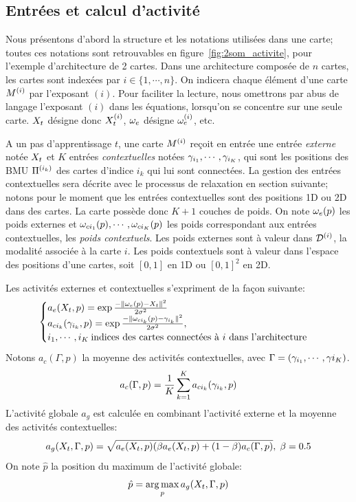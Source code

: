 \subsection{Entrées et calcul d'activité}
Nous présentons d'abord la structure et les notations utilisées dans une carte; toutes ces notations sont retrouvables en figure~\ref{fig:2som_activite}, pour l'exemple d'architecture de 2 cartes. Dans une architecture composée de $n$ cartes, les cartes sont indexées par $i \in \{1,\cdots,n\}$. On indicera chaque élément d'une carte $M^{({i})}$ par l'exposant $(i)$.
Pour faciliter la lecture, nous omettrons par abus de langage l'exposant $(i)$ dans les équations, lorsqu'on se concentre sur une seule carte. $X_t$ désigne donc $X_t^{({i})}$, $\omega_e$ désigne $\omega_e^{({i})}$, etc.


A un pas d'apprentissage $t$, une carte $M^{({i})}$ reçoit en entrée une entrée \emph{externe} notée $X_t$ et $K$ entrées \emph{contextuelles} notées $\gamma_{i_1},\cdots,\gamma_{i_K}$, qui sont les positions des BMU $\Pi^{({i_k})}$ des cartes d'indice $i_k$ qui lui sont connectées. La gestion des entrées contextuelles sera décrite avec le processus de relaxation en section suivante; notons pour le moment que les entrées contextuelles sont des positions 1D ou 2D dans des cartes. 
La carte possède donc $K+1$ couches de poids. On  note $\omega_e(p)$ les poids externes et $\omega_{ci_1}(p), \cdots, \omega_{ci_K}(p)$ les poids correspondant aux entrées contextuelles, les \emph{poids contextuels}. Les poids externes sont à valeur dans $\mathcal{D}^{({i})}$, la modalité associée à la carte $i$. Les poids contextuels sont à valeur dans l'espace des positions d'une cartes, soit $[0,1]$ en 1D ou $[0,1]^2$ en 2D.

Les activités externes et contextuelles s'expriment de la façon suivante:
\begin{equation}
\label{eq:activite}
\begin{cases}
a_e(X_t,p) = \exp\frac{-\lVert \omega_e(p)-X_t \rVert^2}{2\sigma^2} \\
a_{ci_k}(\gamma_{i_k},p) = \exp\frac{-\lVert \omega_{ci_k}(p)-\gamma_{i_k} \rVert ^2}{2\sigma^2}, \\
i_1, \cdots, i_K\: \text{indices des cartes connectées à $i$ dans l'architecture}
\end{cases}
\end{equation}
Notons $a_c(\Gamma,p)$ la moyenne des activités contextuelles, avec $\Gamma = (\gamma_{i_1}, \cdots, \gamma{i_K})$.
\begin{equation}
a_c(\Gamma,p) = \frac{1}{K}\sum_{k=1}^K {a_{ci_k}(\gamma_{i_k},p)}
\end{equation}
L'activité globale $a_g$ est calculée en combinant l'activité externe et la moyenne des activités contextuelles:
\begin{equation}
\label{eq:global_act}
a_g(X_t,\Gamma,p) = \sqrt{a_e(X_t,p)(\beta a_e(X_t,p) + (1-\beta) a_c(\Gamma,p)}, \; \beta=0.5
\end{equation} 
On note $\hat{p}$ la position du maximum de l'activité globale:
\begin{equation}
\label{argmax}
\hat{p} = \operatorname*{arg\,max}_p a_g(X_t, \Gamma,p)
\end{equation}

